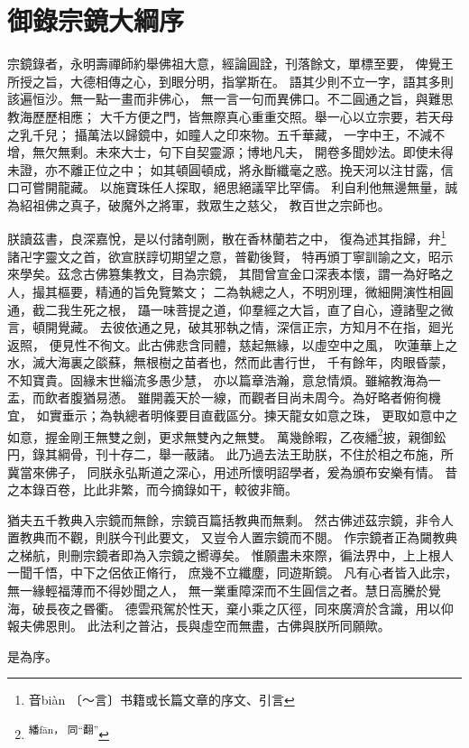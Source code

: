 
\clearpage
\section*{御錄宗鏡大綱序}

宗鏡錄者，永明壽禪師約舉佛祖大意，經論圓詮，刊落餘文，單標至要，
俾覺王所授之旨，大德相傳之心，到眼分明，指掌斯在。
語其少則不立一字，語其多則該遍恒沙。無一點一畫而非佛心，
無一言一句而異佛口。不二圓通之旨，與難思教海歷歷相應；
大千方便之門，皆無際真心重重交照。舉一心以立宗要，若天母之乳千兒；
攝萬法以歸鏡中，如瞳人之印來物。五千華藏，
一字中王，不減不增，無欠無剩。未來大士，句下自契靈源；博地凡夫，
開卷多聞妙法。即使未得未證，亦不離正位之中；
如其頓圓頓成，將永斷纖毫之惑。挽天河以注甘露，信口可嘗開龍藏。
以施寶珠任人探取，絕思絕議罕比罕儔。
利自利他無邊無量，誠為紹祖佛之真子，破魔外之將軍，救眾生之慈父，
教百世之宗師也。

朕讀茲書，良深嘉悅，是以付諸剞劂，散在香林蘭若之中，
復為述其指歸，弁\footnote{ 音biàn 〔～言〕书籍或长篇文章的序文、引言}
諸卍字靈文之首，欲宣朕諄切期望之意，普勸後賢，
特再頒丁寧訓諭之文，昭示來學矣。茲念古佛篡集教文，目為宗鏡，
其間曾宣金口深表本懷，謂一為好略之人，撮其樞要，精通的旨免覽繁文；
二為執總之人，不明別理，微細開演性相圓通，截二我生死之根，
躡一味菩提之道，仰羣經之大旨，直了自心，遵諸聖之微言，頓開覺藏。
去彼依通之見，破其邪執之情，深信正宗，方知月不在指，廻光返照，
便見性不徇文。此古佛悲含同體，慈起無緣，以虛空中之風，
吹蓮華上之水，滅大海裏之燄蘇，無根樹之苗者也，然而此書行世，
千有餘年，肉眼昏蒙，不知寶貴。固緣末世緇流多愚少慧，
亦以篇章浩瀚，意怠情煩。雖縮教海為一盂，而飲者腹猶易懣。
雖開義天於一線，而觀者目尚未周今。為好略者俯徇機宜，
如實垂示；為執總者明條要目直截區分。揀天龍女如意之珠，
更取如意中之如意，握金剛王無雙之劍，更求無雙內之無雙。
萬幾餘暇，乙夜繙\footnote{\textsuperscript{ 繙fān， 同“翻”}}披，親御鈆円，錄其綱骨，刊十存二，舉一蔽諸。
此乃過去法王助朕，不住於相之布施，所冀當來佛子，
同朕永弘斯道之深心，用述所懷明詔學者，爰為頒布安樂有情。
昔之本錄百卷，比此非繁，而今摘錄如干，較彼非簡。


猶夫五千教典入宗鏡而無餘，宗鏡百篇括教典而無剩。
然古佛述茲宗鏡，非令人置教典而不觀，則朕今刊此要文，
又豈令人置宗鏡而不閱。
作宗鏡者正為闚教典之梯航，則刪宗鏡者即為入宗鏡之嚮導矣。
惟願盡未來際，徧法界中，上上根人一聞千悟，中下之侶依正脩行，
庶幾不立纖塵，同遊斯鏡。
凡有心者皆入此宗，無一緣輕福薄而不得妙聞之人，
無一業重障深而不生圓信之者。慧日高騰於覺海，破長夜之昬衢。
德雲飛駕於性天，棄小乘之仄徑，同來廣濟於含識，用以仰報夫佛恩則。
此法利之普沾，長與虛空而無盡，古佛與朕所同願歟。

是為序。
